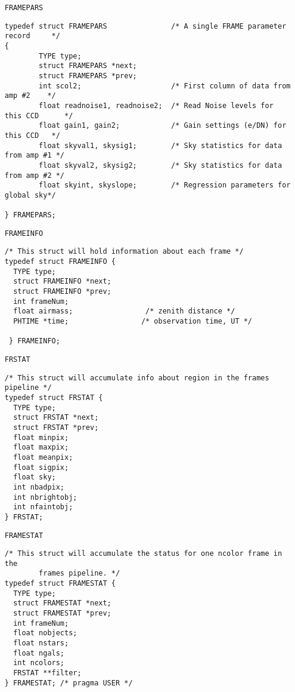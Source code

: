 {\begin{itemize}
\item[{\tt FRAMEPARS}]

\begin{verbatim}
typedef struct FRAMEPARS               /* A single FRAME parameter record     */
{
        TYPE type;
        struct FRAMEPARS *next;
        struct FRAMEPARS *prev;
        int scol2;                     /* First column of data from amp #2    */
        float readnoise1, readnoise2;  /* Read Noise levels for this CCD      */
        float gain1, gain2;            /* Gain settings (e/DN) for this CCD   */
        float skyval1, skysig1;        /* Sky statistics for data from amp #1 */
        float skyval2, skysig2;        /* Sky statistics for data from amp #2 */
        float skyint, skyslope;        /* Regression parameters for global sky*/

} FRAMEPARS;
\end{verbatim}

\item[{\tt FRAMEINFO}]

\begin{verbatim}
/* This struct will hold information about each frame */
typedef struct FRAMEINFO {
  TYPE type;
  struct FRAMEINFO *next;
  struct FRAMEINFO *prev;
  int frameNum;
  float airmass;                 /* zenith distance */
  PHTIME *time;                 /* observation time, UT */

 } FRAMEINFO;
\end{verbatim}

\item[{\tt FRSTAT}]

\begin{verbatim}
/* This struct will accumulate info about region in the frames pipeline */
typedef struct FRSTAT {
  TYPE type;
  struct FRSTAT *next;
  struct FRSTAT *prev;
  float minpix;
  float maxpix;
  float meanpix;
  float sigpix;
  float sky;
  int nbadpix;
  int nbrightobj;
  int nfaintobj;
} FRSTAT;
\end{verbatim}

\item[{\tt FRAMESTAT}]

\begin{verbatim}
/* This struct will accumulate the status for one ncolor frame in the
        frames pipeline. */
typedef struct FRAMESTAT {
  TYPE type;
  struct FRAMESTAT *next;
  struct FRAMESTAT *prev;
  int frameNum;
  float nobjects;
  float nstars;
  float ngals;
  int ncolors;
  FRSTAT **filter;
} FRAMESTAT; /* pragma USER */
\end{verbatim}


\end{itemize}}
